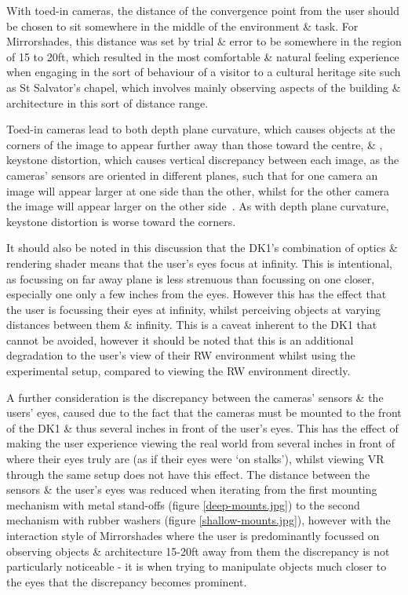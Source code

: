 With toed-in cameras, the distance of the convergence point from the user should be chosen to sit somewhere in the middle of the environment \& task. For Mirrorshades, this distance was set by trial \& error to be somewhere in the region of 15 to 20ft, which resulted in the most comfortable \& natural feeling experience when engaging in the sort of behaviour of a visitor to a cultural heritage site such as St Salvator's chapel, which involves mainly observing aspects of the building \& architecture in this sort of distance range.

Toed-in cameras lead to both depth plane curvature, which causes objects at the corners of the image to appear further away than those toward the centre, \& , keystone distortion, which causes vertical discrepancy between each image, as the cameras' sensors are oriented in different planes, such that for one camera an image will appear larger at one side than the other, whilst for the other camera the image will appear larger on the other side~\cite{Woods1993}. As with depth plane curvature, keystone distortion is worse toward the corners.

It should also be noted in this discussion that the DK1's combination of optics \& rendering shader means that the user's eyes focus at infinity. This is intentional, as focussing on far away plane is less strenuous than focussing on one closer, especially one only a few inches from the eyes. However this has the effect that the user is focussing their eyes at infinity, whilst perceiving objects at varying distances between them \& infinity. This is a caveat inherent to the DK1 that cannot be avoided, however it should be noted that this is an additional degradation to the user's view of their RW environment whilst using the experimental setup, compared to viewing the RW environment directly.

A further consideration is the discrepancy between the cameras' sensors \& the users' eyes, caused due to the fact that the cameras must be mounted to the front of the DK1 \& thus several inches in front of the user's eyes. This has the effect of making the user experience viewing the real world from several inches in front of where their eyes truly are (as if their eyes were `on stalks'), whilst viewing VR through the same setup does not have this effect. The distance between the sensors \& the user's eyes was reduced when iterating from the first mounting mechanism with metal stand-offs (figure \ref{deep-mounts.jpg}) to the second mechanism with rubber washers (figure \ref{shallow-mounts.jpg}), however with the interaction style of Mirrorshades where the user is predominantly focussed on observing objects \& architecture 15-20ft away from them the discrepancy is not particularly noticeable - it is when trying to manipulate objects much closer to the eyes that the discrepancy becomes prominent.

